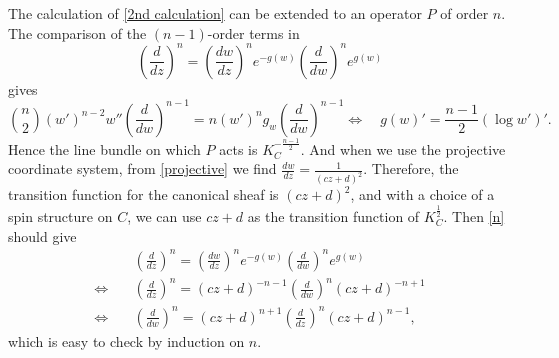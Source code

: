 \documentclass{amsart}
\theoremstyle{definition}
\numberwithin{equation}{section}
\numberwithin{figure}{section}
\newcommand{\be}{\begin{equation}}
\newcommand{\ee}{\end{equation}}
\newcommand{\half}{{\frac{1}{2}}}
\begin{document}
The calculation of \eqref{2nd calculation} can be 
extended to an operator $P$ of order $n$. The comparison of  the $(n-1)$-order terms in
\be
\label{n}
\left(\frac{d}{dz}\right)^n
=
\left(\frac{dw}{dz}\right)^n
e^{-g(w)}\left(\frac{d}{dw}\right)^ne^{g(w)}
\ee                                                                                                                                                                                                                                                                                                                                                                                                                                                                                                                                                                                                                                                                                                                                                                                                                                                                                                                                                                                                                                                                                                                                                                                                                                                                                                                                                                                                                                                                           
gives
$$
\binom{n}{2}(w')^{n-2}w''\left(\frac{d}{dw}\right)^{n-1} 
=n (w')^n g_w \left(\frac{d}{dw}\right)^{n-1}
\Longleftrightarrow 
\quad g(w)' = \frac{n-1}{2}(\log w')'.
$$
Hence the line bundle on which $P$ acts is $K_C^{-\frac{n-1}{2}}$.
And when we use the projective coordinate system, from \eqref{projective}
we find  $\frac{dw}{dz} = \frac{1}{(cz+d)^2}$. Therefore, 
the transition function for the canonical sheaf is $(cz+d)^2$, and with a 
choice of a spin structure on $C$, we can use $cz+d$ as the transition function
of $K_C^\half$. 
Then \eqref{n} should give 
\be
\begin{aligned}
\label{Kn}
&\left(\frac{d}{dz}\right)^n
=
\left(\frac{dw}{dz}\right)^n
e^{-g(w)}\left(\frac{d}{dw}\right)^ne^{g(w)}
\\
\Longleftrightarrow \quad
& \left(\frac{d}{dz}\right)^n
=
(cz+d)^{-n-1}\left(\frac{d}{dw}\right)^n(cz+d)^{-n+1}
\\
\Longleftrightarrow \quad
&\left(\frac{d}{dw}\right)^n
=
(cz+d)^{n+1}\left(\frac{d}{dz}\right)^n(cz+d)^{n-1},
\end{aligned}
\ee
which is easy to check by induction on $n$. 
\end{document}
